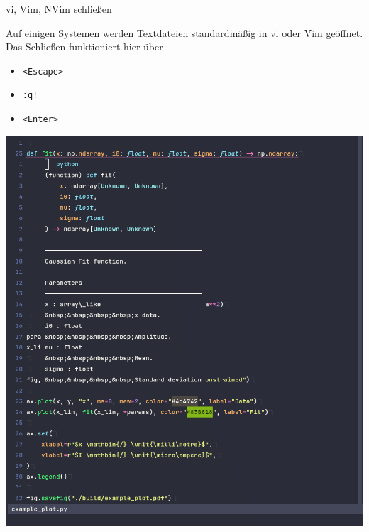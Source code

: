 \begin{frame}{vi, Vim, NVim schließen}
  \begin{minipage}{.4\textwidth}
    Auf einigen Systemen werden Textdateien standardmäßig in vi oder Vim geöffnet.
    Das Schließen funktioniert hier über
    \begin{itemize}
      \item \texttt{<Escape>}
      \item \texttt{:q!}
      \item \texttt{<Enter>}
    \end{itemize}
    \vfill
  \end{minipage}
  \hfill
  \begin{minipage}{.5\textwidth}
    \includegraphics[width=.9\textwidth]{figures/nvim_example_screenshot.png}
  \end{minipage}
\end{frame}
